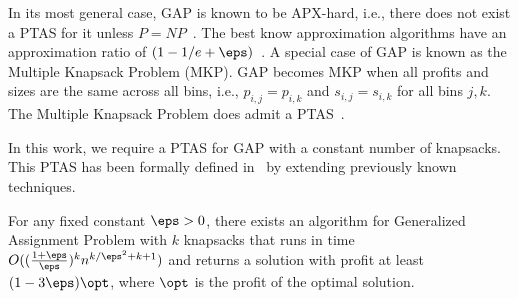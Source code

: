In its most general case, GAP is known to be APX-hard, i.e., there does not exist a PTAS for it unless $P=NP$~\cite{ChekuriK05}. The best know approximation algorithms have an approximation ratio of $(1-1/e+\eps)$~\cite{FeigeV06,FleischerGMS11}. A special case of GAP is known as the Multiple Knapsack Problem (MKP). GAP becomes MKP when all profits and sizes are the same across all bins, i.e., $p_{i,j}=p_{i,k}$ and $s_{i,j}=s_{i,k}$ for all bins $j,k.$  The Multiple Knapsack Problem does admit a PTAS~\cite{ChekuriK05}. 

In this work, we require a PTAS for GAP with a constant number of knapsacks. This PTAS has been formally defined in~\cite{2dks-Lpacking} by extending previously known techniques.

\begin{lemma}
    \label{lem:gap}
    For any fixed constant $\eps>0$, there exists an algorithm for Generalized Assignment Problem with $k$ knapsacks that runs in time $O((\frac{1+\eps}{\eps})^k n^{k/\eps^2+k+1})$ and returns a solution with profit at least $(1-3\eps)\opt$, where $\opt$ is the profit of the optimal solution. 
    
\end{lemma}



